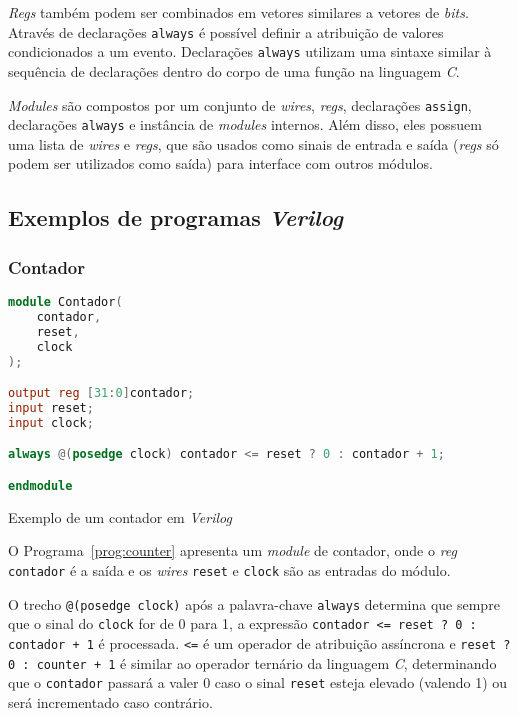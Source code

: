 \emph{Regs} também podem ser combinados em vetores similares a vetores de \emph{bits}.
Através de declarações \texttt{always} é possível definir a atribuição de valores condicionados a um evento.
Declarações \texttt{always} utilizam uma sintaxe similar à sequência de declarações dentro do corpo de uma 
função na linguagem \emph{C}.

\emph{Modules} são compostos por um conjunto de \emph{wires}, \emph{regs}, declarações \texttt{assign},
declarações \texttt{always} e instância de \emph{modules} internos. Além disso, eles possuem uma lista de \emph{wires}
e \emph{regs}, que são usados como sinais de entrada e saída (\emph{regs} só podem ser utilizados como saída)
para interface com outros módulos.

\subsection{Exemplos de programas \emph{Verilog}}
\label{sec:exverilog}

\subsubsection{Contador}
\label{ssec:counter}

\begin{program}
  \centering

\begin{lstlisting}[language=Verilog, style=wider]
module Contador(
    contador,
    reset,
    clock
);

output reg [31:0]contador;
input reset;
input clock;

always @(posedge clock) contador <= reset ? 0 : contador + 1;

endmodule
\end{lstlisting}

  \caption{Exemplo de um contador em \emph{Verilog}\label{prog:counter}}
\end{program}

O Programa~\ref{prog:counter} apresenta um \emph{module} de contador,
onde o \emph{reg} \texttt{contador} é a saída e os \emph{wires}
\texttt{reset} e \texttt{clock} são as entradas do módulo.

O trecho \texttt{@(posedge clock)} após a palavra-chave
\texttt{always} determina que sempre que o sinal do \texttt{clock} for de
0 para 1, a expressão \texttt{contador <= reset ? 0 : contador + 1}
é processada. \texttt{<=} é um operador de atribuição assíncrona e
\texttt{reset ? 0 : counter + 1} é similar ao operador ternário da linguagem
\emph{C}, determinando que o  \texttt{contador} passará a valer 0
caso o sinal \texttt{reset} esteja elevado (valendo 1) ou será incrementado
caso contrário.

